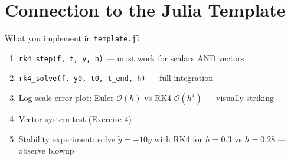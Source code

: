 \documentclass[12pt, a4paper]{article}
\begin{document}
\section{Connection to the Julia Template}

\begin{theorybox}{What you implement in \texttt{template.jl}}
\begin{enumerate}
  \item \texttt{rk4\_step(f, t, y, h)} — must work for scalars AND vectors
  \item \texttt{rk4\_solve(f, y0, t0, t\_end, h)} — full integration
  \item Log-scale error plot: Euler $\mathcal{O}(h)$ vs RK4 $\mathcal{O}(h^4)$ — visually striking
  \item Vector system test (Exercise 4)
  \item Stability experiment: solve $\dot{y}=-10y$ with RK4 for $h=0.3$ vs $h=0.28$ — observe blowup
\end{enumerate}
\end{theorybox}
\end{document}
